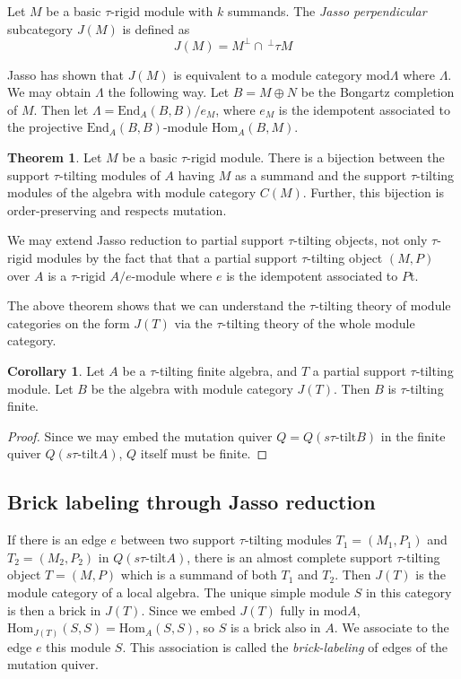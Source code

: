 \documentclass[]{article}
\theoremstyle{definition}
\newtheorem{theorem}{Theorem}[section]
\newtheorem{corollary}{Corollary}[section]
\newcommand{\tu}{\ensuremath{\tau}}
\begin{document}
Let $M$ be a basic \tu-rigid module with $k$ summands. The \textit{Jasso perpendicular} subcategory $J(M)$ is defined as \[J(M) = M^\perp \cap \, ^{\perp}\tau M\]

Jasso has shown that $J(M)$ is equivalent to a module category $\text{mod} \Lambda$ where $\Lambda$. We may obtain $\Lambda$ the following way. Let $B = M \oplus N$ be the Bongartz completion of $M$. Then let $\Lambda = \text{End}_A(B,B)/e_M$, where $e_M$ is the idempotent associated to the projective $\text{End}_A(B,B)$-module $\text{Hom}_A(B,M)$.


\begin{theorem}\cite[Theorem 3.15]{jassoreduction}
	Let $M$ be a basic \tu-rigid module. There is a bijection between the support \tu-tilting modules of $A$ having $M$ as a summand and the support \tu-tilting modules of the algebra with module category $C(M)$. Further, this bijection is order-preserving and respects mutation.
\end{theorem}

We may extend Jasso reduction to partial support \tu-tilting objects, not only \tu-rigid modules by the fact that that a partial support \tu-tilting object $(M,P)$ over $A$ is a \tu-rigid $A/e$-module where $e$ is the idempotent associated to $P$t\cite{tau}.

The above theorem shows that we can understand the \tu-tilting theory of module categories on the form $J(T)$ via the \tu-tilting theory of the whole module category. 

\begin{corollary}
	Let $A$ be a \tu-tilting finite algebra, and $T$ a partial support \tu-tilting module. Let $B$ be the algebra with module category $J(T)$. Then $B$ is \tu-tilting finite.
\end{corollary}

\begin{proof}
	Since we may embed the mutation quiver $Q = Q(s\tu\text{-tilt} B)$ in the finite quiver $Q(s\tu\text{-tilt} A)$, $Q$ itself must be finite.
\end{proof}

\subsection{Brick labeling through Jasso reduction}
If there is an edge $e$ between two support \tu-tilting modules $T_1 = (M_1,P_1)$ and $T_2 = (M_2,P_2)$ in $Q(s\tu\text{-tilt} A)$, there is an almost complete support \tu-tilting object $T = (M,P)$ which is a summand of both $T_1$ and $T_2$. Then $J(T)$ is the module category of a local algebra. The unique simple module $S$ in this category is then a brick in $J(T)$. Since we embed $J(T)$ fully in $\text{mod} A$, $\text{Hom}_{J(T)}(S,S) = \text{Hom}_A(S,S)$, so $S$ is a brick also in $A$. We associate to the edge $e$ this module $S$. This association is called the \textit{brick-labeling} of edges of the mutation quiver.
\end{document}
